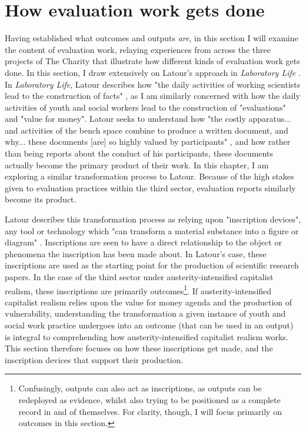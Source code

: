 \section{How evaluation work gets done}
\label{sec: 6-4-eval-work}
Having established what outcomes and outputs \emph{are}, in this section I will examine the content of evaluation work, relaying experiences from across the three projects of The Charity that illustrate how different kinds of evaluation work gets done. In this section, I draw extensively on Latour's approach in \emph{Laboratory Life} \citep{latour_laboratory_1986}. In \emph{Laboratory Life}, Latour describes how "the daily activities of working scientists lead to the construction of facts" \citep[40]{latour_laboratory_1986}, as I am similarly concerned with how the daily activities of youth and social workers lead to the construction of "evaluations" and "value for money". Latour seeks to understand how "the costly apparatus... and activities of the bench space combine to produce a written document, and why... these documents [are] so highly valued by participants" \citep[48]{latour_laboratory_1986}, and how rather than being reports about the conduct of his participants, these documents actually become the primary product of their work. In this chapter, I am exploring a similar transformation process to Latour. Because of the high stakes given to evaluation practices within the third sector, evaluation reports similarly become its product. 

Latour describes this transformation process as relying upon "inscription devices", any tool or technology which "can transform a material substance into a figure or diagram" \citep[51]{latour_laboratory_1986}. Inscriptions are seen to have a direct relationship to the object or phenomena the inscription has been made about. In Latour's case, these inscriptions are used as the starting point for the production of scientific research papers. In the case of the third sector under austerity-intensified capitalist realism, these inscriptions are primarily outcomes\footnote{Confusingly, outputs can also act as inscriptions, as outputs can be redeployed as evidence, whilst also trying to be positioned as a complete record in and of themselves. For clarity, though, I will focus primarily on outcomes in this section.}.  If austerity-intensified capitalist realism relies upon the value for money agenda and the production of vulnerability, understanding the transformation a given instance of  youth and social work practice undergoes into an outcome (that can be used in an output) is integral to comprehending how austerity-intensified capitalist realism works. This section therefore focuses on how  these inscriptions get made, and the inscription devices that support their production.

